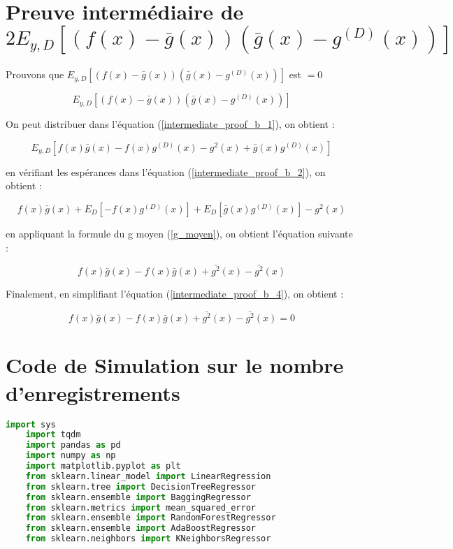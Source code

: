 \documentclass[a4paper]{article}
\begin{document}
\begin{appendices}
	\section{Preuve intermédiaire de $2E_{y,D} [(f(x)-\bar{g}(x)) (\bar{g}(x) - g^{(D)}(x)) ]$}
	\label{intermediate_proof_b_subsection}
	Prouvons que $E_{y,D} [(f(x)-\bar{g}(x)) (\bar{g}(x) - g^{(D)}(x)) ]$ est $= 0$ 
	
	\begin{equation}
		\label{intermediate_proof_b_1}
		E_{y,D} [(f(x)-\bar{g}(x)) (\bar{g}(x) - g^{(D)}(x)) ]
	\end{equation}
	
	On peut distribuer dans l'équation (\ref{intermediate_proof_b_1}), on obtient :
	
	\begin{equation}
		\label{intermediate_proof_b_2}
		E_{y,D} [ f(x)\bar{g}(x) - f(x)g^{(D)}(x) -g^2(x) + \bar{g}(x)g^{(D)}(x)]
	\end{equation}
	
	en vérifiant les espérances dans l'équation (\ref{intermediate_proof_b_2}), on obtient :
	
	\begin{equation}
		\label{intermediate_proof_b_3}
		f(x)\bar{g}(x) + E_{D} [- f(x)g^{(D)}(x)] + E_{D} [ \bar{g}(x)g^{(D)}(x)] -g^2(x)
	\end{equation}
	
	en appliquant la formule du g moyen (\ref{g_moyen}), on obtient l'équation suivante :
	
	\begin{equation}
		\label{intermediate_proof_b_4}
		f(x)\bar{g}(x) - f(x)\bar{g}(x) + \bar{g^2}(x) -\bar{g^2}(x)
	\end{equation}
	
	Finalement, en simplifiant l'équation (\ref{intermediate_proof_b_4}), on obtient :
	
	\begin{equation}
		\label{intermediate_proof_b_5}
		f(x)\bar{g}(x) - f(x)\bar{g}(x) + \bar{g^2}(x) -\bar{g^2}(x) = 0
	\end{equation}

\newpage

\section{Code de Simulation sur le nombre d'enregistrements}

\begin{lstlisting}[language=Python]
	import sys
	import tqdm
	import pandas as pd
	import numpy as np
	import matplotlib.pyplot as plt
	from sklearn.linear_model import LinearRegression
	from sklearn.tree import DecisionTreeRegressor
	from sklearn.ensemble import BaggingRegressor
	from sklearn.metrics import mean_squared_error
	from sklearn.ensemble import RandomForestRegressor
	from sklearn.ensemble import AdaBoostRegressor
	from sklearn.neighbors import KNeighborsRegressor
	

\end{lstlisting}
\end{appendices}
\end{document}
